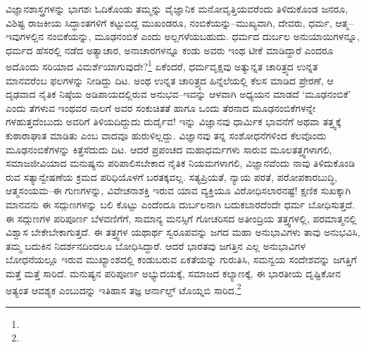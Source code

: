 ವಿಜ್ಞಾನಶಾಸ್ತ್ರಗಳನ್ನು ಭಾಗಶಃ ಓದಿಕೊಂಡು ತಮ್ಮನ್ನು ವೈಜ್ಞಾನಿಕ ಮನೋವೃತ್ತಿಯವರೆಂದು ತಿಳಿದುಕೊಂಡ ಜನರೂ, ವಿಶಿಷ್ಟ ರಾಜಕೀಯ ಸಿದ್ಧಾಂತಗಳಿಗೆ ಕಟ್ಟುಬಿದ್ದ ಮುಖಂಡರೂ, ನಂಬಿಕೆಯನ್ನು–ಮುಖ್ಯವಾಗಿ, ದೇವರು, ಧರ್ಮ, ಆತ್ಮ–ಇವುಗಳಲ್ಲಿನ ನಂಬಿಕೆಯನ್ನು, ಮೂಢನಂಬಿಕೆ ಎಂದು ಅಲ್ಲಗಳೆಯಬಹುದು. ಧರ್ಮದ ದುರ್ಬಲ ಅನುಯಾಯಿಗಳನ್ನೂ, ಧರ್ಮದ ಹೆಸರಲ್ಲಿ ನಡೆದ ಅತ್ಯಾಚಾರ, ಅನಾಚಾರಗಳನ್ನೂ ಕಂಡು ಅವರು ಇಂಥ ಟೀಕೆ ಮಾಡಿದ್ದಾರೆ ಎಂದರೂ ಅದೊಂದು ಸರಿಯಾದ ವಿಮರ್ಶೆಯಾಗುವುದೇ?\footnote{\hfill{}


\hfill{}} ಏಕೆಂದರೆ, ಧರ್ಮವೃಕ್ಷವು ಅತ್ಯುನ್ನತ ಚಾರಿತ್ರ್ಯದ ಉನ್ನತ ಮಾನವರೆಂಬ ಫಲಗಳನ್ನು ನೀಡಿದ್ದು ದಿಟ. ಅಂಥ ಉನ್ನತ ಚಾರಿತ್ರ್ಯದ ಹಿನ್ನೆಲೆಯಲ್ಲಿ ಕೆಲಸ ಮಾಡಿದ ಪ್ರೇರಣೆ, ಆ ದೃಢವಾದ ನೈತಿಕ ನಿಷ್ಠೆಯ ಅಡಿಪಾಯದಲ್ಲಿರುವ ಅನುಭವ–ಇವನ್ನು ಆಳವಾಗಿ ಅಧ್ಯಯನ ಮಾಡದೆ ‘ಮೂಢನಂಬಿಕೆ’ ಎಂದು ತೆಗಳುವ ಇಂಥವರ ನಾಲಗೆ ಅವರ ಸಂಕುಚಿತತೆ ಹಾಗೂ ಒಂದು ತೆರನಾದ ಮೂಢನಂಬಿಕೆಗಳನ್ನೇ ಗಳಹುತ್ತದೆಂಬುದು ಅವರಿಗೆ ತಿಳಿಯದಿದ್ದುದು ದುರ್ದೈವ! ಇನ್ನು ವಿಜ್ಞಾನವು ಧಾರ್ಮಿಕ ಭಾವನೆಗೆ ಅಥವಾ ತತ್ತ್ವಕ್ಕೆ ಕುಠಾರಾಘಾತ ಮಾಡಿತು ಎಂಬ ವಾದವೂ ಹುರುಳಿಲ್ಲದ್ದು. ವಿಜ್ಞಾನವು ತನ್ನ ಸಂಶೋಧನೆಗಳಿಂದ ಕೆಲವೊಂದು ಮೂಢನಂಬಿಕೆಗಳನ್ನು ಕಿತ್ತೆಸೆದುದು ದಿಟ. ಆದರೆ ಪ್ರಪಂಚದ ಮಹಾಧರ್ಮಗಳು ಸಾರುವ ಮೂಲತತ್ತ್ವಗಳಾಗಲಿ, ಸಮಾಜಜೀವಿಯಾದ ಮನುಷ್ಯನು ಪರಿಪಾಲಿಸಬೇಕಾದ ನೈತಿಕ ನಿಯಮಗಳಾಗಲಿ, ವಿಜ್ಞಾನವೆಂದು ನಾವು ತಿಳಿದುಕೊಂಡಿ ರುವ ಸತ್ಯಾನ್ವೇಷಣೆಯ ಕ್ರಮದ ಪರಿಧಿಯೊಳಗೆ ಬರತಕ್ಕವಲ್ಲ. ಸತ್ಯಪ್ರಿಯತೆ, ನ್ಯಾಯ ಪರತೆ, ಪರೋಪಕಾರಬುದ್ಧಿ, ಆತ್ಮಸಂಯಮ–ಈ ಗುಣಗಳನ್ನು, ವಿವೇಚನಾಶಕ್ತಿ ಇರುವ ಯಾವ ವ್ಯಕ್ತಿಯೂ ವಿರೋಧಿಸಲಾರನಷ್ಟೆ! ಕ್ಷಣಿಕ ಸುಖಕ್ಕಾಗಿ ಮಾನವನು ಈ ಸದ್ಗುಣಗಳನ್ನು ಬಲಿ ಕೊಟ್ಟು ಎಂದೆಂದೂ ದುರ್ಬಲನಾಗಿ ಬದುಕಬಾರದೆಂದೇ ಧರ್ಮ ಬೋಧಿಸುತ್ತದೆ. ಈ ಸದ್ಗುಣಗಳ ಪರಿಪೂರ್ಣ ಬೆಳವಣಿಗೆಗೆ, ಸಾಮಾನ್ಯ ಮನಸ್ಸಿಗೆ ಗೋಚರಿಸದ ಅತೀಂದ್ರಿಯ ತತ್ತ್ವಗಳಲ್ಲಿ, ಪರಮಾತ್ಮನಲ್ಲಿ ವಿಶ್ವಾಸ ಬೇಕೇಬೇಕಾಗುತ್ತದೆ. ಈ ತತ್ತ್ವಗಳ ಯಥಾರ್ಥ ಸ್ವರೂಪವನ್ನು ಜಗದ ಮಹಾ ಅನುಭಾವಿಗಳು ತಾವು ಅನುಭವಿಸಿ, ತಮ್ಮ ಬದುಕಿನ ನಿದರ್ಶನದಿಂದಲೂ ಬೋಧಿಸಿದ್ದಾರೆ. ಆದರೆ ಭಾರತವು ಜಗತ್ತಿನ ಎಲ್ಲ ಅನುಭಾವಿಗಳ ಬೋಧನೆಯಲ್ಲೂ ಇರುವ ಮುಖ್ಯಾಂಶದಲ್ಲಿ ಕಂಡುಬರುವ ಏಕತೆಯನ್ನು ಗುರುತಿಸಿ, ಸಮನ್ವಯ ಸಂದೇಶವನ್ನು ಜಗತ್ತಿಗೆ ಮತ್ತೆ ಮತ್ತೆ ಸಾರಿದೆ. ಮನುಷ್ಯನ ಪರಿಪೂರ್ಣ ಅಭ್ಯುದಯಕ್ಕೆ, ಸಮಾಜದ ಕಲ್ಯಾಣಕ್ಕೆ, ಈ ಭಾರತೀಯ ದೃಷ್ಟಿಕೋನ ಅತ್ಯಂತ ಆವಶ್ಯಕ ಎಂಬುದನ್ನು ಇತಿಹಾಸ ತಜ್ಞ ಆರ್ನಾಲ್ಡ್ ಟೊಯ್ನಬಿ ಸಾರಿದ.\footnote{

}
